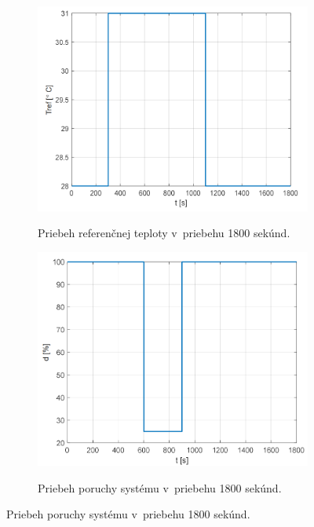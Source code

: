 \documentclass{article}
\begin{document}
\begin{figure}[!htbp]
	\begin{subfigure}{0.5\textwidth}
		\includegraphics[width=\textwidth]{./include/ziadanaHodnota.png}
		\label{fig:ziadanaHodnota}
		\caption{Priebeh referenčnej teploty v~priebehu 1800 sekúnd.}
	\end{subfigure}
	\hfill
	\begin{subfigure}{0.5\textwidth}
		\includegraphics[width=\textwidth]{./include/porucha.png}
		\label{fig:porucha}
		\caption{Priebeh poruchy systému v~priebehu 1800 sekúnd.}
	\end{subfigure}
\end{figure}
\end{document}
